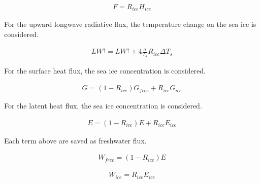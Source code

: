 \begin{eqnarray}
    F = R_{ice} H_{ice}
\end{eqnarray}

For the upward longwave radiative flux, the temperature change on the
sea ice is considered.

\begin{eqnarray}
    LW^\uparrow=LW^\uparrow +  4\frac{\sigma}{T_s}R_{ice}  \Delta T_s
\end{eqnarray}

For the surface heat flux, the sea ice concentration is considered.

\begin{eqnarray}
    G=(1-R_{ice})G_{free} + R_{ice}G_{ice}
\end{eqnarray}

For the latent heat flux, the sea ice concentration is considered.

\begin{eqnarray}
    E=(1-R_{ice})E + R_{ice}E_{ice}
\end{eqnarray}

Each term above are saved as freshwater flux.

\begin{eqnarray}
    W_{free} = (1-R_{ice}) E
\end{eqnarray}

\begin{eqnarray}
    W_{ice} = R_{ice} E_{ice}
\end{eqnarray}
